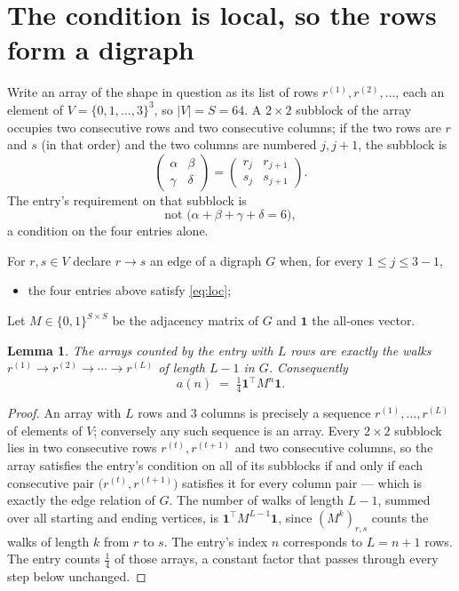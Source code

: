 \documentclass[11pt,a4paper]{article}
\theoremstyle{plain}
\newtheorem{lemma}[theorem]{Lemma}
\theoremstyle{definition}
\begin{document}
\section{The condition is local, so the rows form a digraph}

Write an array of the shape in question as its list of rows
$r^{(1)},r^{(2)},\dots$, each an element of
$V=\{0,1,\dots,3\}^{3}$, so $|V|=S=64$. A $2\times2$ subblock of the array
occupies two consecutive rows and two consecutive columns; if the two rows are $r$
and $s$ (in that order) and the two columns are numbered $j,j+1$,
the subblock is
\[
\begin{pmatrix}\alpha&\beta\\\gamma&\delta\end{pmatrix}=\begin{pmatrix}r_j&r_{j+1}\\s_j&s_{j+1}\end{pmatrix}.
\]
The entry's requirement on that subblock is
\begin{equation}\label{eq:loc}
\text{not }\bigl(\alpha+\beta+\gamma+\delta=6\bigr),
\end{equation}
a condition on the four entries alone.

For $r,s\in V$ declare $r\to s$ an edge of a digraph $G$ when, for every
$1\le j\le 3-1$,
\begin{itemize}
\item the four entries above satisfy \eqref{eq:loc};

\end{itemize}
Let $M\in\{0,1\}^{S\times S}$ be the adjacency matrix of $G$ and $\mathbf{1}$ the
all-ones vector.

\begin{lemma}\label{lem:walk}
The arrays counted by the entry with $L$ rows are exactly the walks
$r^{(1)}\to r^{(2)}\to\cdots\to r^{(L)}$ of length $L-1$ in $G$. Consequently
\[
a(n)\;=\;\tfrac1{4}\mathbf{1}^{\!\top}M^{n}\mathbf{1} .
\]
\end{lemma}

\begin{proof}
An array with $L$ rows and $3$ columns is precisely a sequence
$r^{(1)},\dots,r^{(L)}$ of elements of $V$; conversely any such sequence is an array.
Every $2\times2$ subblock lies in two consecutive rows $r^{(t)},r^{(t+1)}$ and two
consecutive columns, so the array satisfies the entry's condition on all of its subblocks
if and only if each consecutive pair $\bigl(r^{(t)},r^{(t+1)}\bigr)$ satisfies it for
every column pair --- which is exactly the edge relation of $G$. The number of walks of
length $L-1$, summed over all starting and ending vertices, is
$\mathbf{1}^{\!\top}M^{L-1}\mathbf{1}$, since $(M^{k})_{r,s}$ counts the walks of
length $k$ from $r$ to $s$. The entry's index $n$ corresponds to $L=n+1$ rows. The entry counts $\tfrac1{4}$ of those arrays, a constant factor that passes through every step below unchanged.
\end{proof}
\end{document}
